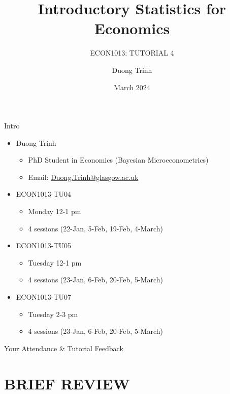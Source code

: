 \documentclass[
  11pt,
  ignorenonframetext,
]{beamer}
\title{Introductory Statistics for Economics}
\subtitle{ECON1013: TUTORIAL 4}
\author{Duong Trinh}
\date{March 2024}
\institute{University of Glasgow}
\providecommand{\tightlist}{%
  \setlength{\itemsep}{0pt}\setlength{\parskip}{0pt}}
\begin{document}
\frame{\titlepage}

\begin{frame}{Intro}
\protect\hypertarget{intro}{}
\begin{itemize}
\tightlist
\item
  Duong Trinh

  \begin{itemize}
  \tightlist
  \item
    PhD Student in Economics (Bayesian Microeconometrics)
  \item
    Email: \underline{Duong.Trinh@glasgow.ac.uk}
  \end{itemize}
\end{itemize}

\vspace{3mm}

\begin{itemize}
\tightlist
\item
  ECON1013-TU04

  \begin{itemize}
  \tightlist
  \item
    Monday 12-1 pm
  \item
    4 sessions (22-Jan, 5-Feb, 19-Feb, 4-March)
  \end{itemize}
\item
  ECON1013-TU05

  \begin{itemize}
  \tightlist
  \item
    Tuesday 12-1 pm
  \item
    4 sessions (23-Jan, 6-Feb, 20-Feb, 5-March)
  \end{itemize}
\item
  ECON1013-TU07

  \begin{itemize}
  \tightlist
  \item
    Tuesday 2-3 pm
  \item
    4 sessions (23-Jan, 6-Feb, 20-Feb, 5-March)
  \end{itemize}
\end{itemize}
\end{frame}

\begin{frame}{Your Attendance \& Tutorial Feedback}
\protect\hypertarget{your-attendance-tutorial-feedback}{}
\end{frame}

\hypertarget{brief-review}{%
\section{BRIEF REVIEW}\label{brief-review}}
\end{document}
